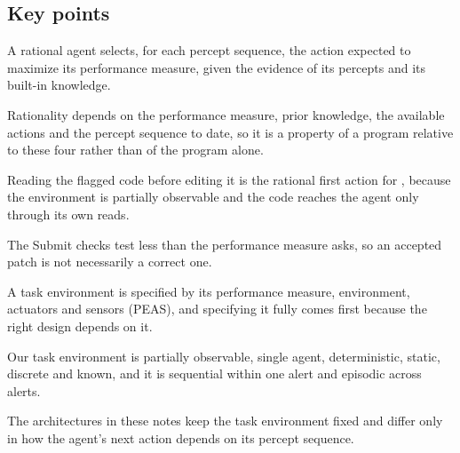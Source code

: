 \subsection*{Key points}
\bi
\item A rational agent selects, for each percept sequence, the action expected to maximize its
performance measure, given the evidence of its percepts and its built-in knowledge.
\item Rationality depends on the performance measure, prior knowledge, the available actions and
the percept sequence to date, so it is a property of a program relative to these four rather than
of the program alone.
\item Reading the flagged code before editing it is the rational first action for \msa{}, because
the environment is partially observable and the code reaches the agent only through its own reads.
\item The Submit checks test less than the performance measure asks, so an accepted patch is not
necessarily a correct one.
\item A task environment is specified by its performance measure, environment, actuators and
sensors (PEAS), and specifying it fully comes first because the right design depends on it.
\item Our task environment is partially observable, single agent, deterministic, static, discrete
and known, and it is sequential within one alert and episodic across alerts.
\item The architectures in these notes keep the task environment fixed and differ only in how the
agent's next action depends on its percept sequence.
\ei

